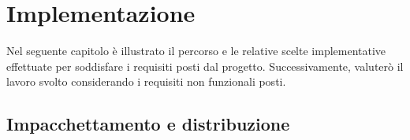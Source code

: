 

\chapter{Implementazione}

Nel seguente capitolo è illustrato il percorso e le relative scelte implementative effettuate per soddisfare i requisiti posti dal progetto. Successivamente, valuterò il lavoro svolto considerando i requisiti non funzionali posti.

\section{Impacchettamento e distribuzione}

